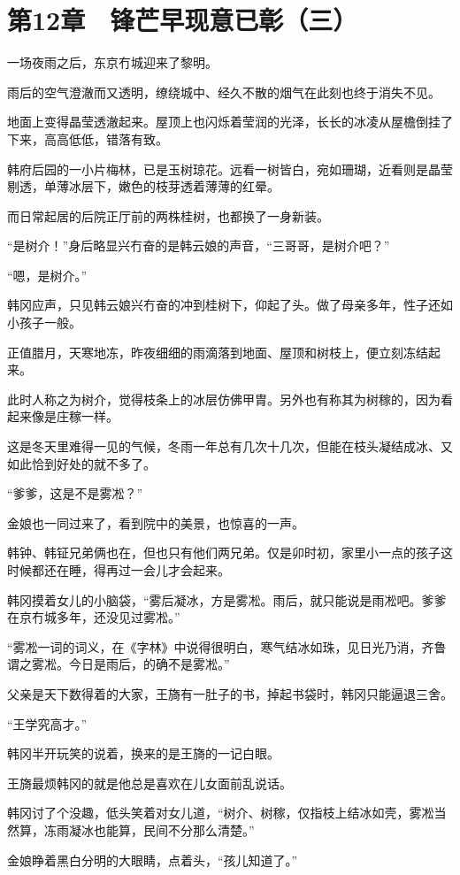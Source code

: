 \section{第12章　锋芒早现意已彰（三）}

一场夜雨之后，东京冇城迎来了黎明。

雨后的空气澄澈而又透明，缭绕城中、经久不散的烟气在此刻也终于消失不见。

地面上变得晶莹透澈起来。屋顶上也闪烁着莹润的光泽，长长的冰凌从屋檐倒挂了下来，高高低低，错落有致。

韩府后园的一小片梅林，已是玉树琼花。远看一树皆白，宛如珊瑚，近看则是晶莹剔透，单薄冰层下，嫩色的枝芽透着薄薄的红晕。

而日常起居的后院正厅前的两株桂树，也都换了一身新装。

“是树介！”身后略显兴冇奋的是韩云娘的声音，“三哥哥，是树介吧？”

“嗯，是树介。”

韩冈应声，只见韩云娘兴冇奋的冲到桂树下，仰起了头。做了母亲多年，性子还如小孩子一般。

正值腊月，天寒地冻，昨夜细细的雨滴落到地面、屋顶和树枝上，便立刻冻结起来。

此时人称之为树介，觉得枝条上的冰层仿佛甲胄。另外也有称其为树稼的，因为看起来像是庄稼一样。

这是冬天里难得一见的气候，冬雨一年总有几次十几次，但能在枝头凝结成冰、又如此恰到好处的就不多了。

“爹爹，这是不是雾凇？”

金娘也一同过来了，看到院中的美景，也惊喜的一声。

韩钟、韩钲兄弟俩也在，但也只有他们两兄弟。仅是卯时初，家里小一点的孩子这时候都还在睡，得再过一会儿才会起来。

韩冈摸着女儿的小脑袋，“雾后凝冰，方是雾凇。雨后，就只能说是雨凇吧。爹爹在京冇城多年，还没见过雾凇。”

“雾凇一词的词义，在《字林》中说得很明白，寒气结冰如珠，见日光乃消，齐鲁谓之雾凇。今日是雨后，的确不是雾凇。”

父亲是天下数得着的大家，王旖有一肚子的书，掉起书袋时，韩冈只能逼退三舍。

“王学究高才。”

韩冈半开玩笑的说着，换来的是王旖的一记白眼。

王旖最烦韩冈的就是他总是喜欢在儿女面前乱说话。

韩冈讨了个没趣，低头笑着对女儿道，“树介、树稼，仅指枝上结冰如壳，雾凇当然算，冻雨凝冰也能算，民间不分那么清楚。”

金娘睁着黑白分明的大眼睛，点着头，“孩儿知道了。”

